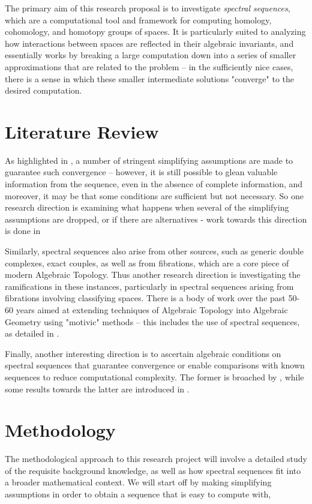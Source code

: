 \documentclass[normal]{aomart}
\newtheorem[{}\it]{thm}{Theorem}[section]
\theoremstyle{definition}
\newtheorem*[{}\it]{notation}{Notation}
\begin{document}
The primary aim of this research proposal is to investigate \textit{spectral sequences}, which are a computational tool and framework for computing homology, cohomology, and homotopy groups of spaces. It is particularly suited to analyzing how interactions between spaces are reflected in their algebraic invariants, and essentially works by breaking a large computation down into a series of smaller approximations that are related to the problem -- in the sufficiently nice cases, there is a sense in which these smaller intermediate solutions "converge" to the desired computation.


\section{Literature Review}

As highlighted in \cite{Chow2006}, a number of stringent simplifying assumptions are made to guarantee such convergence -- however, it is still possible to glean valuable information from the sequence, even in the absence of complete information, and moreover, it may be that some conditions are sufficient but not necessary. So one research direction is examining what happens when several of the simplifying assumptions are dropped, or if there are alternatives - work towards this direction is done in \cite{Eilenberg1962}

Similarly, spectral sequences also arise from other sources, such as generic double complexes, exact couples, as well as from fibrations, which are a core piece of modern Algebraic Topology. Thus another research direction is investigating the ramifications in these instances, particularly in spectral sequences arising from fibrations involving classifying spaces. There is a body of work over the past 50-60 years aimed at extending techniques of Algebraic Topology into Algebraic Geometry using "motivic" methods -- this includes the use of spectral sequences, as detailed in \cite{Dugger2010}.

Finally, another interesting direction is to ascertain algebraic conditions on spectral sequences that guarantee convergence or enable comparisons with known sequences to reduce computational complexity. The former is broached by \cite{Boardman1999}, while some results towards the latter are introduced in \cite{Zeeman1957}.

\section{Methodology} 
The methodological approach to this research project will involve a detailed study of the requisite background knowledge, as well as how spectral sequences fit into a broader mathematical context. We will start off by making simplifying assumptions in order to obtain a sequence that is easy to compute with, 
\end{document}
